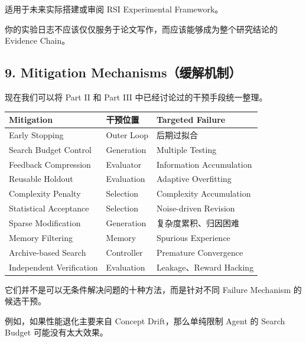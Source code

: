 适用于未来实际搭建或审阅 RSI Experimental Framework。

你的实验日志不应该仅仅服务于论文写作，而应该能够成为整个研究结论的 Evidence Chain。

\hypertarget{part-3-48-0001-mitigation-mechanismsux7f13ux89e3ux673aux5236}{%
\subsection{9. Mitigation Mechanisms（缓解机制）}\label{part-3-48-0001-mitigation-mechanismsux7f13ux89e3ux673aux5236}}

现在我们可以将 Part II 和 Part III 中已经讨论过的干预手段统一整理。

\begin{readertable}
\begin{longtable}[]{@{}
  >{\raggedright\arraybackslash}p{}
  >{\raggedright\arraybackslash}p{}
  >{\raggedright\arraybackslash}p{}@{}}
\toprule
Mitigation & 干预位置 & Targeted Failure \\
\midrule
\endhead
Early Stopping & Outer Loop & 后期过拟合 \\
Search Budget Control & Generation & Multiple Testing \\
Feedback Compression & Evaluator & Information Accumulation \\
Reusable Holdout & Evaluation & Adaptive Overfitting \\
Complexity Penalty & Selection & Complexity Accumulation \\
Statistical Acceptance & Selection & Noise-driven Revision \\
Sparse Modification & Generation & 复杂度累积、归因困难 \\
Memory Filtering & Memory & Spurious Experience \\
Archive-based Search & Controller & Premature Convergence \\
Independent Verification & Evaluation & Leakage、Reward Hacking \\
\bottomrule
\end{longtable}
\end{readertable}

它们并不是可以无条件解决问题的十种方法，而是针对不同 Failure Mechanism 的候选干预。

例如，如果性能退化主要来自 Concept Drift，那么单纯限制 Agent 的 Search Budget 可能没有太大效果。

